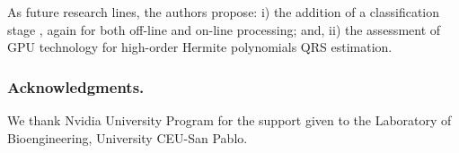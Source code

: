 \documentclass[runningheads]{llncs}
\begin{document}
As future research lines, the authors propose: i) the addition of a classification stage \cite{j:barbakhF08}, again for both off-line and on-line processing; and, ii) the assessment of GPU technology for high-order Hermite polynomials QRS estimation.

\subsubsection*{Acknowledgments.} We thank Nvidia University Program for the support given to the Laboratory of Bioengineering, University CEU-San Pablo. %




\end{document}
